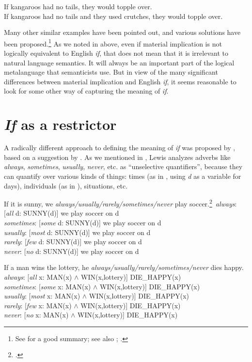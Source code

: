 \ea \label{ex:19.26}
\ea  If kangaroos had no tails, they would topple over.\\
\ex If kangaroos had no tails and they used crutches, they would topple over.
                       \z
\z


Many other similar examples have been pointed out, and various solutions have been proposed.\footnote{See  for a good summary; see also \citet[83--87]{Gazdar1979}; \citet[ch2--3]{Bennett2003}.} As we noted in  above, even if material implication is not logically equivalent to English \textit{if}, that does not mean that it is irrelevant to natural language semantics. It will always be an important part of the logical metalanguage that semanticists use. But in view of the many significant differences between material implication and English \textit{if}, it seems reasonable to look for some other way of capturing the meaning of \textit{if}.


\section{\textit{If} as a restrictor}\label{sec:19.5}

A radically different approach to defining the meaning of \textit{if} was proposed by \citet{Kratzer1986}, based on a suggestion by \citet{Lewis1975}. As we mentioned in , Lewis analyzes adverbs like \textit{always}, \textit{sometimes}, \textit{usually}, \textit{never}, etc. as “unselective quantifiers”, because they can quantify over various kinds of things: times (as in , using \textit{d} as a variable for days), individuals (as in ), situations, etc.


\ea \label{ex:19.27}
If it is sunny, we \textit{always/usually/rarely/sometimes/never} play soccer.\footnote{\citet{Lewis1975}.}\
\textit{always}:  [\textit{all} d: SUNNY(d)] we play soccer on d\\
\textit{sometimes}: [\textit{some} d: SUNNY(d)] we play soccer on d\\
\textit{usually}: [\textit{most} d: SUNNY(d)] we play soccer on d\\
\textit{rarely}: [\textit{few} d: SUNNY(d)] we play soccer on d\\
\textit{never}: [\textit{no} d: SUNNY(d)] we play soccer on d
\z \z


\ea \label{ex:19.28}
If a man wins the lottery, he \textit{always/usually/rarely/sometimes/never} dies happy.\\
\textit{always}:  [\textit{all} x: MAN(x) $\wedge$ WIN(x,lottery)] DIE\_HAPPY(x)\\
\textit{sometimes}:  [\textit{some} x: MAN(x) $\wedge$ WIN(x,lottery)] DIE\_HAPPY(x)\\
\textit{usually}:  [\textit{most} x: MAN(x) $\wedge$ WIN(x,lottery)] DIE\_HAPPY(x)\\
\textit{rarely}:  [\textit{few} x: MAN(x) $\wedge$ WIN(x,lottery)] DIE\_HAPPY(x)\\
\textit{never}:  [\textit{no} x: MAN(x) $\wedge$ WIN(x,lottery)] DIE\_HAPPY(x)
\z


